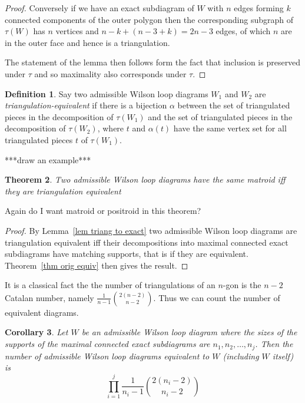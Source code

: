 \documentclass[11pt]{article}
\newtheorem{thm}{Theorem}[section]
\newtheorem{cor}[thm]{Corollary}
\theoremstyle{remark}
\theoremstyle{definition}
\newtheorem{dfn}[thm]{Definition}
\begin{document}
\begin{proof}
  Conversely if we have an exact subdiagram of $W$ with $n$ edges forming $k$ connected components of the outer polygon then the corresponding subgraph of $\tau(W)$ has $n$ vertices and $n-k+(n-3+k) = 2n-3$ edges, of which $n$ are in the outer face and hence is a triangulation.

  The statement of the lemma then follows form the fact that inclusion is preserved under $\tau$ and so maximality also corresponds under $\tau$.
\end{proof}

\begin{dfn}
  Say two admissible Wilson loop diagrams $W_1$ and $W_2$ are \emph{triangulation-equivalent} if there is a bijection $\alpha$ between the set of triangulated pieces in the decomposition of $\tau(W_1)$ and the set of triangulated pieces in the decomposition of $\tau(W_2)$, where $t$ and $\alpha(t)$ have the same vertex set for all triangulated pieces $t$ of $\tau(W_1)$.
\end{dfn}

***draw an example***

\begin{thm}
  Two admissible Wilson loop diagrams have the same matroid iff they are triangulation equivalent
\end{thm}

Again do I want matroid or positroid in this theorem?

\begin{proof}
  By Lemma~\ref{lem triang to exact} two admissible Wilson loop diagrams are triangulation equivalent iff their decompositions into maximal connected exact subdiagrams have matching supports, that is if they are equivalent.
  Theorem~\ref{thm orig equiv} then gives the result.
\end{proof}

It is a classical fact the the number of triangulations of an $n$-gon is the $n-2$ Catalan number, namely $\frac{1}{n-1}\binom{2(n-2)}{n-2}$.  Thus we can count the number of equivalent diagrams.

\begin{cor}
  Let $W$ be an admissible Wilson loop diagram where the sizes of the supports of the maximal connected exact subdiagrams are $n_1, n_2, \ldots, n_j$.  Then the number of admissible Wilson loop diagrams equivalent to $W$ (including $W$ itself) is
  \[
  \prod_{i=1}^{j} \frac{1}{n_i-1}\binom{2(n_i-2)}{n_i-2}
  \]
\end{cor}
\end{document}
